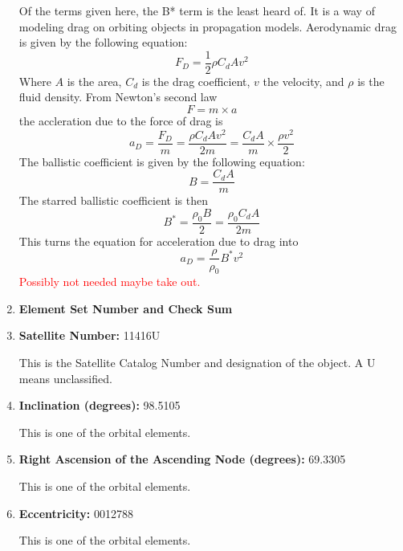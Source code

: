 \documentclass[12pt]{report}
\begin{document}
\begin{enumerate}
		Of the terms given here, the B* term is the least heard of. It is a way of modeling drag on orbiting objects in propagation models.  
		Aerodynamic drag is given by the following equation:
		\begin{equation}
		F_D = \frac{1}{2}\rho C_d A v^2
		\end{equation}
		Where $A$ is the area, $C_d$ is the drag coefficient, $v$ the velocity, and $\rho$ is the fluid density. From Newton's second law
		\begin{equation}
		F = m\times a
		\end{equation}
		the accleration due to the force of drag is 
		\begin{equation}
		a_D=\frac{F_D}{m}=\frac{\rho C_d A v^2}{2m}=\frac{ C_d A}{m}\times\frac{\rho v^2}{2}
		\end{equation}
		The ballistic coefficient is given by the following equation:
		\begin{equation}
		B=\frac{ C_d A}{m}
		\end{equation}
		The starred ballistic coefficient is then
		\begin{equation}
		B^{*} = \frac{\rho_0 B}{2}=\frac{\rho_0 C_d A}{2m}
		\end{equation}
		This turns the equation for acceleration due to drag into \cite{celestrak_TLE_FAQ}\cite{castor2_BSTAR}
		\begin{equation}
		a_D=\frac{\rho}{\rho_0}B^{*} v^2
		\end{equation}
		\textcolor{red}{Possibly not needed maybe take out. }\par 
		\item \textbf{Element Set Number and Check Sum}
		
		\item \textbf{Satellite Number: } 11416U
		
		This is the Satellite Catalog Number and designation of the object. A U means unclassified. 
		
		\item \textbf{Inclination (degrees): }98.5105
		
		This is one of the orbital elements.
		\item \textbf{Right Ascension of the Ascending Node (degrees): }69.3305
		
		This is one of the orbital elements.
		
		\item \textbf{Eccentricity: } 0012788
		
		This is one of the orbital elements.
		

\end{enumerate}
\end{document}
